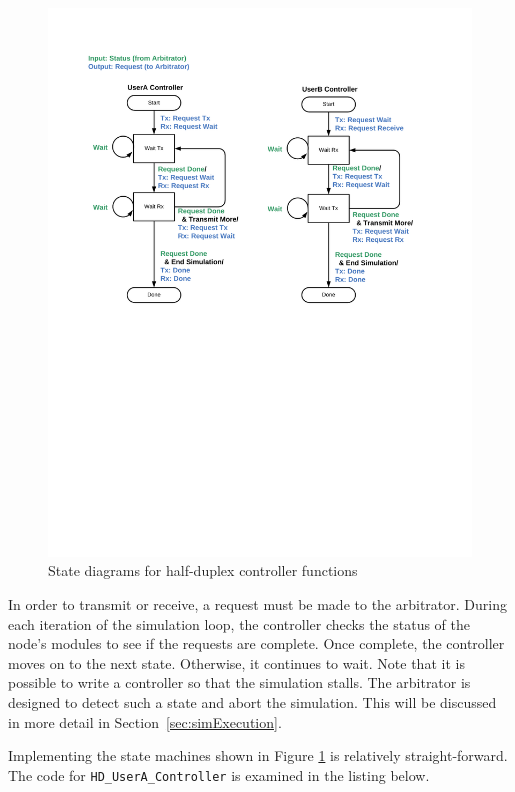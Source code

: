 \begin{figure}[h]
\centering
\includegraphics[width=5in]{figs/HD_State_Diagram}
\caption{State diagrams for half-duplex controller functions}
\label{fig:hdState}
\end{figure}

In order to transmit or receive, a request must be made to the
arbitrator.  During each iteration of the simulation loop, the
controller checks the status of the node's modules to see if the
requests are complete.  Once complete, the controller moves on to
the next state.  Otherwise, it continues to wait.  Note that it is
possible to write a controller so that the simulation stalls.  The
arbitrator is designed to detect such a state and abort the
simulation.  This will be discussed in more detail in
Section~\ref{sec:simExecution}.

Implementing the state machines shown in Figure \ref{fig:hdState} is
relatively straight-forward.  The code for
\verb+HD_UserA_Controller+ is examined in the listing below.

